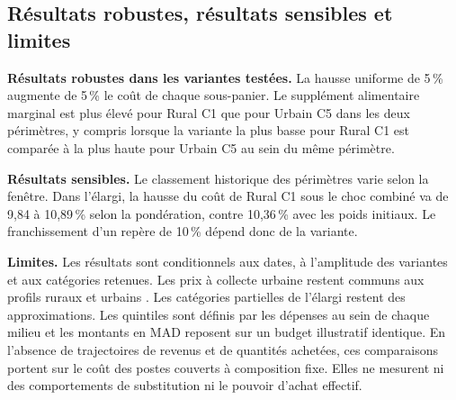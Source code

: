 \subsection{Résultats robustes, résultats sensibles et limites}

\textbf{Résultats robustes dans les variantes testées.} La hausse uniforme de 5\,\% augmente de 5\,\% le coût de chaque sous-panier. Le supplément alimentaire marginal est plus élevé pour Rural C1 que pour Urbain C5 dans les deux périmètres, y compris lorsque la variante la plus basse pour Rural C1 est comparée à la plus haute pour Urbain C5 au sein du même périmètre.

\textbf{Résultats sensibles.} Le classement historique des périmètres varie selon la fenêtre. Dans l'élargi, la hausse du coût de Rural C1 sous le choc combiné va de 9,84 à 10,89\,\% selon la pondération, contre 10,36\,\% avec les poids initiaux. Le franchissement d'un repère de 10\,\% dépend donc de la variante.

\textbf{Limites.} Les résultats sont conditionnels aux dates, à l'amplitude des variantes et aux catégories retenues. Les prix à collecte urbaine restent communs aux profils ruraux et urbains \cite{hcpIPC}. Les catégories partielles de l'élargi restent des approximations. Les quintiles sont définis par les dépenses au sein de chaque milieu et les montants en MAD reposent sur un budget illustratif identique. En l'absence de trajectoires de revenus et de quantités achetées, ces comparaisons portent sur le coût des postes couverts à composition fixe. Elles ne mesurent ni des comportements de substitution ni le pouvoir d'achat effectif.
